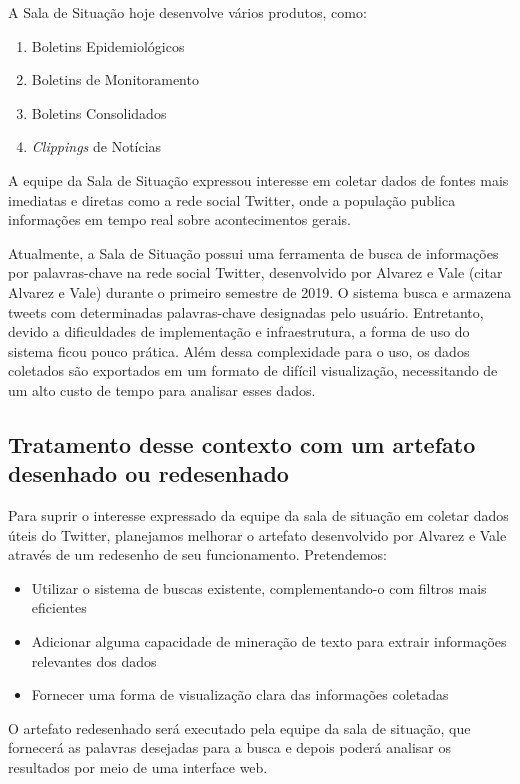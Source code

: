 \documentclass[12pt]{article}
\newcommand{\rascbegin}{\color{red}}    %
\newcommand{\rascend}{\color{black}}    %
\begin{document}
    A Sala de Situação hoje desenvolve vários produtos, como:
    \begin{enumerate}
        \item Boletins Epidemiológicos
        \item Boletins de Monitoramento
        \item Boletins Consolidados
        \item \textit{Clippings} de Notícias
    \end{enumerate}
    A equipe da Sala de Situação expressou interesse em coletar dados de fontes mais imediatas e diretas como a rede social Twitter, onde a população publica informações em tempo real sobre acontecimentos gerais.
    
    Atualmente, a Sala de Situação possui uma ferramenta de busca de informações por palavras-chave na rede social Twitter, desenvolvido por Alvarez e Vale \rascbegin(citar Alvarez e Vale) \rascend durante o primeiro semestre de 2019. O sistema busca e armazena tweets com determinadas palavras-chave designadas pelo usuário. Entretanto, devido a dificuldades de implementação e infraestrutura, a forma de uso do sistema ficou pouco prática. Além dessa complexidade para o uso, os dados coletados são exportados em um formato de difícil visualização, necessitando de um alto custo de tempo para analisar esses dados.
    
    
    


	\subsection{Tratamento desse contexto com um artefato dese\-nhado ou redesenhado\label{tratamento}}
	
	Para suprir o interesse expressado da equipe da sala de situação em coletar dados úteis do Twitter, planejamos melhorar o artefato desenvolvido por Alvarez e Vale através de um redesenho de seu funcionamento. Pretendemos:
	\begin{itemize}
	    \item Utilizar o sistema de buscas existente, complementando-o com filtros mais eficientes
	    \item Adicionar alguma capacidade de mineração de texto para extrair informações relevantes dos dados
	    \item Fornecer uma forma de visualização clara das informações coletadas
	\end{itemize}
	
	O artefato redesenhado será executado pela equipe da sala de situação, que fornecerá as palavras desejadas para a busca e depois poderá analisar os resultados por meio de uma interface web.
	
\end{document}
